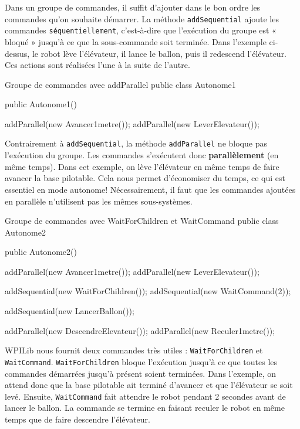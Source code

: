 \documentclass[12pt]{report}
\begin{document}
Dans un groupe de commandes, il suffit d'ajouter dans le bon ordre les commandes qu'on souhaite démarrer. La méthode \texttt{addSequential} ajoute les commandes \texttt{séquentiellement}, c'est-à-dire que l'exécution du groupe est « bloqué » jusqu'à ce que la sous-commande soit terminée. Dans l'exemple ci-dessus, le robot lève l'élévateur, il lance le ballon, puis il redescend l'élévateur. Ces actions sont réalisées l'une à la suite de l'autre.

\begin{MyTCB}{Groupe de commandes avec addParallel}
public class Autonome1 {
	
	public Autonome1() {
	
		addParallel(new Avancer1metre());
		addParallel(new LeverElevateur());
		
	}
	
}
\end{MyTCB}

Contrairement à \texttt{addSequential}, la méthode \texttt{addParallel} ne bloque pas l'exécution du groupe. Les commandes s'exécutent donc \textbf{parallèlement} (en même temps). Dans cet exemple, on lève l'élévateur en même temps de faire avancer la base pilotable. Cela nous permet d'économiser du temps, ce qui est essentiel en mode autonome! Nécessairement, il faut que les commandes ajoutées en parallèle n'utilisent pas les mêmes sous-systèmes.

\begin{MyTCB}{Groupe de commandes avec WaitForChildren et WaitCommand}
public class Autonome2 {
	
	public Autonome2() {
	
		addParallel(new Avancer1metre());
		addParallel(new LeverElevateur());
		
		addSequential(new WaitForChildren());
		addSequential(new WaitCommand(2));
		
		addSequential(new LancerBallon());
		
		addParallel(new DescendreElevateur());
		addParallel(new Reculer1metre());
		
	}
	
}
\end{MyTCB}

WPILib nous fournit deux commandes très utiles : \texttt{WaitForChildren} et \texttt{WaitCommand}. \texttt{WaitForChildren} bloque l'exécution jusqu'à ce que toutes les commandes démarrées jusqu'à présent soient terminées. Dans l'exemple, on attend donc que la base pilotable ait terminé d'avancer et que l'élévateur se soit levé. Ensuite, \texttt{WaitCommand} fait attendre le robot pendant 2 secondes avant de lancer le ballon. La commande se termine en faisant reculer le robot en même temps que de faire descendre l'élévateur.
\end{document}
